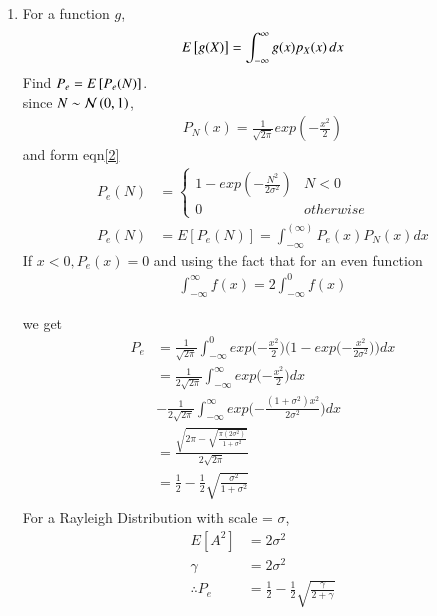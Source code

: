 \documentclass[journal,12pt,twocolumn]{IEEEtran}
\renewcommand\thesection{\arabic{section}}
\begin{document}
\begin{enumerate}[label=\thesection.\arabic*
,ref=\thesection.\theenumi]
\begin{align}\label{2}
\therefore   P_e(N) &=
    \begin{cases}
        1 - exp(-\frac{N^2}{2\sigma^2}) & N<0
        \\
        0 & otherwise 
    \end{cases}
\end{align}
\item
%
\label{ch4_anal}
For a function $g$,
\begin{equation}
E{}\left[g(X)\right] = \int_{-\infty}^{\infty}g(x)p_{X}(x)\, dx
\end{equation}
%
Find $P_e = E{}\left[P_e(N)\right]$.\\
%
\solution since $N \sim \mathcal{N}\left(0,1\right)$,
\begin{align}
    P_N(x) = \frac{1}{\sqrt{2\pi}} exp(-\frac{x^2}{2})
\end{align}
and form eqn\ref{2} 
\begin{align}
    P_e(N) &=
        \begin{cases}
            1 - exp(-\frac{N^2}{2\sigma^2}) & N<0
            \\
            0 & otherwise 
        \end{cases}\\
        P_e(N) &= E[P_e(N)]=\int_{-\infty}^(\infty)P_e(x)P_N(x)dx
    \end{align} 
If $x<0 , P_e(x) = 0$ and using the fact that for an even function
\begin{align}
    \int_{-\infty}^{\infty} f(x) = 2\int_{-\infty}^{0} f(x)
\end{align}

we get 
\begin{align}
    P_e &= \frac{1}{\sqrt{2\pi}} \int_{-\infty}^{0} exp\bigg({-\frac{x^2}{2}}\bigg)\bigg(1-exp\bigg({-\frac{x^2}{2\sigma^2}}\bigg)\bigg)dx\\
    &= \frac{1}{2\sqrt{2\pi}}\int_{-\infty}^{\infty} exp\bigg({-\frac{x^2}{2}}\bigg)dx\\ &- \frac{1}{2\sqrt{2\pi}}\int_{-\infty}^{\infty} exp\bigg({-\frac{(1+\sigma^2)x^2}{2\sigma^2}}\bigg)dx\\
    &= \frac{\sqrt{2\pi - \sqrt{\frac{\pi(2\sigma^2)}{1+\sigma^2}}}}{2\sqrt{2\pi}}\\
    &=\frac{1}{2} - \frac{1}{2}\sqrt{\frac{\sigma^2}{1+\sigma^2}}\\    
\end{align}
For a Rayleigh Distribution with scale = $\sigma$,
\begin{align}
    E[A^2] &= 2\sigma^2 \\
    \gamma &= 2\sigma^2 \\
    \therefore P_e &=\frac{1}{2} - \frac{1}{2}\sqrt{\frac{\gamma}{2+\gamma}}
\end{align}


\end{enumerate}
\end{document}
